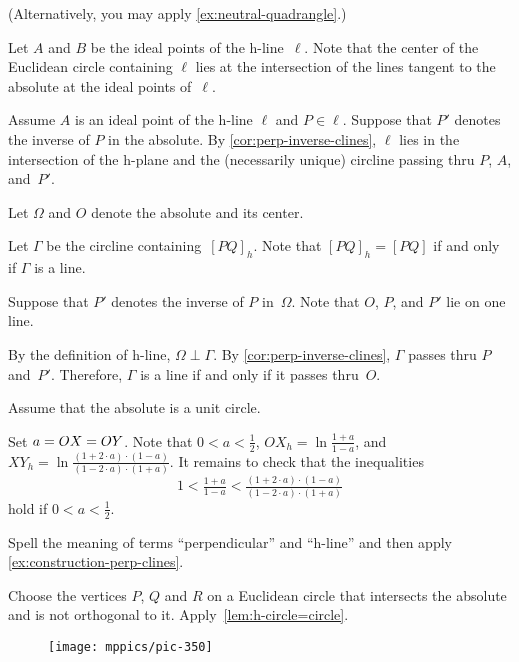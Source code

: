 \begin{multicols}{2}
(Alternatively, you may apply \ref{ex:neutral-quadrangle}.)

\setcounter{eqtn}{0}

Let $A$ and $B$ be the ideal points of the h-line~$\ell$. 
Note that the center of the Euclidean circle containing $\ell$ lies 
at the intersection of the lines tangent to the absolute at the ideal points of~$\ell$.

Assume $A$ is an ideal point of the h-line $\ell$
and $P\in \ell$.
Suppose that $P'$ denotes the inverse of $P$ in the absolute.
By \ref{cor:perp-inverse-clines},
$\ell$ lies in the intersection of the h-plane and the (necessarily unique) circline 
passing thru $P$, $A$, and~$P'$.

Let $\Omega$ and $O$ denote the absolute and its center. 

Let $\Gamma$ be the circline containing~$[PQ]_h$.
Note that $[PQ]_h=[PQ]$ if and only if $\Gamma$ is a line.

Suppose that $P'$ denotes the inverse of $P$ in~$\Omega$.
Note that $O$, $P$, and $P'$ lie on one line.

By the definition of h-line, $\Omega\perp \Gamma$.
By \ref{cor:perp-inverse-clines}, $\Gamma$ passes thru $P$ and~$P'$. 
Therefore, $\Gamma$
is a line if and only if it passes thru~$O$.

Assume that the absolute is a unit circle.

Set $a\z=OX\z=OY$.
Note that $0<a<\tfrac12$,
$
OX_h=\ln \tfrac{1+a}{1-a}$,
and
$XY_h=\ln \tfrac{(1+2\cdot a)\cdot(1-a)}{(1-2\cdot a)\cdot(1+a)}$.
It remains to check that the inequalities 
\[1<
\tfrac{1+a}{1-a}
<
\tfrac{(1+2\cdot a)\cdot(1-a)}{(1-2\cdot a)\cdot(1+a)}\]
hold if $0<a<\tfrac12$.

Spell the meaning of terms ``perpendicular'' and ``h-line'' and then apply \ref{ex:construction-perp-clines}.



Choose the vertices $P$, $Q$ and $R$ on a Euclidean circle that intersects the absolute and is not orthogonal to it.
Apply~\ref{lem:h-circle=circle}.

\begin{wrapfigure}{r}{34mm}
\vskip-4mm
\centering
\texttt{[image: mppics/pic-350]}
\end{wrapfigure}


\end{multicols}
